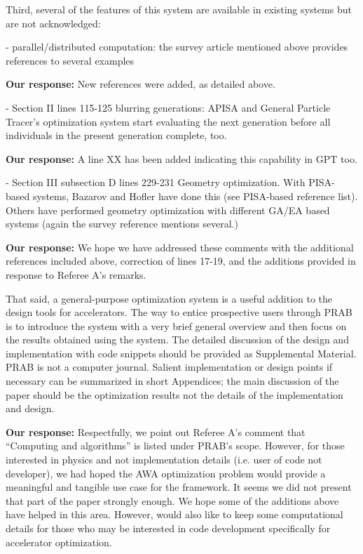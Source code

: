 \documentclass{article}
\begin{document}
Third, several of the features of this system are available in
existing systems but are not acknowledged:

- parallel/distributed computation: the survey article mentioned above
provides references to several examples

{\bf Our response:} {\color{blue} New references were added, as detailed above.}

- Section II lines 115-125 blurring generations: APISA and General
Particle Tracer’s optimization system start evaluating the next
generation before all individuals in the present generation complete,
too.

{\bf Our response:} {\color{blue} A line XX has been added indicating this capability in GPT too.}

- Section III subsection D lines 229-231 Geometry optimization. With
PISA-based systems, Bazarov and Hofler have done this (see PISA-based
reference list). Others have performed geometry optimization with
different GA/EA based systems (again the survey reference mentions
several.)

{\bf Our response:} {\color{blue} We hope we have addressed these comments with the additional references included above, correction of lines 17-19, 
	and the additions provided in response to Referee A's remarks.}

That said, a general-purpose optimization system is a useful addition
to the design tools for accelerators. The way to entice prospective
users through PRAB is to introduce the system with a very brief
general overview and then focus on the results obtained using the
system. The detailed discussion of the design and implementation with
code snippets should be provided as Supplemental Material. PRAB is not
a computer journal. Salient implementation or design points if
necessary can be summarized in short Appendices; the main discussion
of the paper should be the optimization results not the details of the
implementation and design. 

{\bf Our response:} {\color{blue} 
	Respectfully, we point out Referee A's comment that 
	``Computing and algorithms'' is listed under PRAB's scope. 
	However, for those interested in physics and not implementation details (i.e. user of code not developer), 
	we had hoped the AWA optimization problem would 
	provide a meaningful and tangible use case for the framework.
	It seems we did not present that part of the paper strongly enough. 
	We hope some of the additions above have helped in this area.
	However, would also like to keep some computational details for those who 
	may be interested in code development specifically for accelerator optimization.
}
\end{document}
